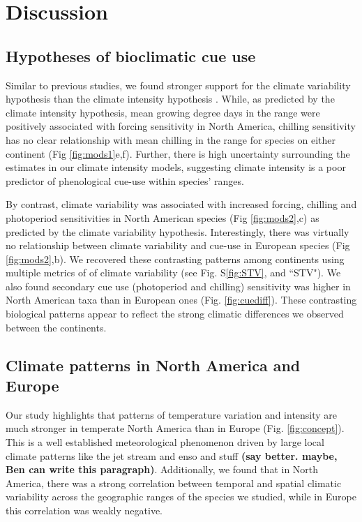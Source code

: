 \documentclass[12pt]{article}
\begin{document}
\section*{Discussion}
\subsection*{Hypotheses of bioclimatic cue use} %
Similar to previous studies, we found stronger support for the climate variability hypothesis than the climate intensity hypothesis \citep{Zohner:2017aa}. While, as predicted by the climate intensity hypothesis, mean growing degree days in the range were positively associated with forcing sensitivity in North America, chilling sensitivity has no clear relationship with mean chilling in the range for species on either continent (Fig \ref{fig:mods1}e,f).  Further, there is high uncertainty surrounding the estimates in our climate intensity models, suggesting climate intensity is a poor predictor of phenological cue-use within species' ranges.

\noindent By contrast, climate variability was associated with increased forcing, chilling and photoperiod sensitivities in North American species (Fig \ref{fig:mods2},c) as predicted by the climate variability hypothesis. Interestingly, there was virtually no relationship between climate variability and cue-use in European species (Fig \ref{fig:mods2},b). We recovered these contrasting patterns among continents using multiple metrics of of climate variability (see Fig. S\ref{fig:STV}, and ``STV"). We also found secondary cue use (photoperiod and chilling) sensitivity was higher in North American taxa than in European ones (Fig. \ref{fig:cuediff}). These contrasting biological patterns appear to reflect the strong climatic differences we observed between the continents. %

\subsection*{Climate patterns in North America and Europe}
Our study highlights that patterns of temperature variation and intensity are much stronger in temperate North America than in Europe (Fig. \ref{fig:concept}). This is a well established meteorological phenomenon driven by large local climate patterns like the jet stream and enso and stuff \textbf{(say better. maybe, Ben can write this paragraph)}. Additionally, we found that in North America, there was a strong correlation between temporal and spatial climatic variability across the geographic ranges of the species we studied, while in Europe this correlation was weakly negative. %
\end{document}
